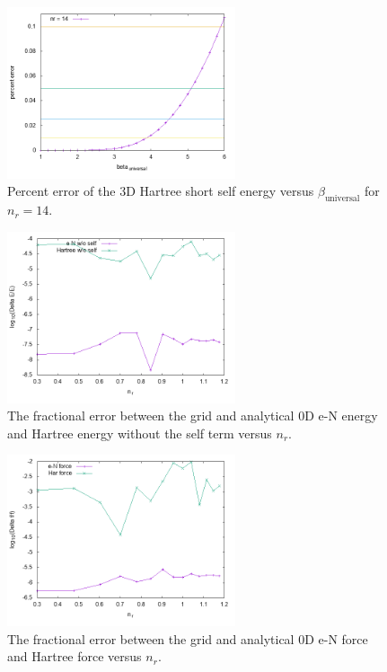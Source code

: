 \documentclass[paper=a4, fontsize=11pt]{article} %
\numberwithin{equation}{section} %
\numberwithin{figure}{section} %
\numberwithin{table}{section} %
\begin{document}
\begin{figure}[!htbp] 
    \centering
    \includegraphics[width=0.6\textwidth]{error3D}
    \caption{Percent error of the 3D Hartree short self energy versus $\beta_{\mathrm{universal}}$ for $n_r = 14$.} 
    \label{fig:error3D}
\end{figure}

\begin{figure}[!htbp] 
    \centering
    \includegraphics[width=0.6\textwidth]{conv}
    \caption{The fractional error between the grid and analytical 0D e-N energy and Hartree energy without the self term versus $n_r$.} 
    \label{fig:conv0D}
\end{figure}

\begin{figure}[!htbp] 
    \centering
    \includegraphics[width=0.6\textwidth]{fconv}
    \caption{The fractional error between the grid and analytical 0D e-N force and Hartree force versus $n_r$.} 
    \label{fig:fconv0D}
\end{figure}
\end{document}
